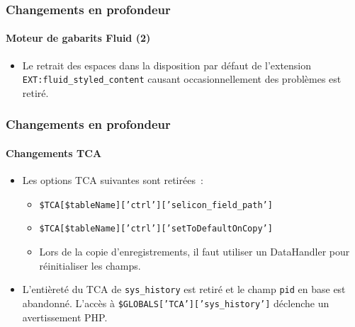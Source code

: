 
\begin{frame}[fragile]
	\frametitle{Changements en profondeur}
	\framesubtitle{Moteur de gabarits Fluid (2)}

	\begin{itemize}
		\item Le retrait des espaces dans la disposition par défaut de l'extension \texttt{EXT:fluid\_styled\_content}
			causant occasionnellement des problèmes est retiré.

	\end{itemize}

\end{frame}


\begin{frame}[fragile]
	\frametitle{Changements en profondeur}
	\framesubtitle{Changements TCA}

	\begin{itemize}
		\item Les options TCA suivantes sont retirées~:

			\begin{itemize}
				\item \texttt{\$TCA[\$tableName]['ctrl']['selicon\_field\_path']}
				\item \texttt{\$TCA[\$tableName]['ctrl']['setToDefaultOnCopy']}
			\end{itemize}

			\begin{itemize}\smaller
				\item[\ding{228}] Lors de la copie d'enregistrements, il faut utiliser un DataHandler pour réinitialiser les champs.
			\end{itemize}\normalsize

		\item L'entièreté du TCA de \texttt{sys\_history} est retiré et le champ \texttt{pid} en base est abandonné.
			L'accès à \texttt{\$GLOBALS['TCA']['sys\_history']} déclenche un avertissement PHP\@.

	\end{itemize}

\end{frame}

